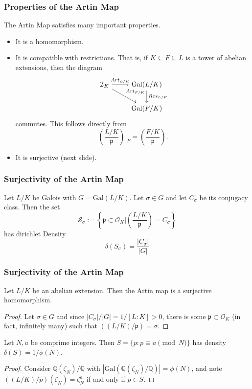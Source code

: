 \documentclass{beamer}
\newcommand{\Gal}{\mathrm{Gal}}
\newcommand{\QQ}{\mathbb{Q}}
\newcommand{\pp}{\mathfrak{p}}
\theoremstyle{plain}
\begin{document}
\begin{frame}[fragile]
    \frametitle{Properties of the Artin Map}
    The Artin Map satisfies many important properties.
    \begin{itemize}
        \item It is a homomorphism.
        \item It is compatible with restrictions. That is, if $K\subseteq F\subseteq L$ is a tower of abelian extensions, then the diagram
        \[
            \begin{tikzcd}
                \mathcal{I}_K \arrow[r,"Art_{L/K}"] \arrow[dr,"Art_{F/K}"] & \Gal(L/K) \arrow[d,"Res_{L/F}"] \\
                 & \Gal(F/K)
            \end{tikzcd}
        \]
        commutes. This follows directly from 
        $$\left(\frac{L/K}{\pp}\right)\bigg|_{F}=\left(\frac{F/K}{\pp}\right).$$
        \item It is surjective (next slide).
    \end{itemize}
\end{frame}

\begin{frame}
    \frametitle{Surjectivity of the Artin Map}
    \begin{theorem} Let $L/K$ be Galois with $G=\Gal(L/K)$. Let $\sigma\in G$ and let $C_\sigma$ be its conjugacy class. Then the set 
    $$\mathcal{S}_\sigma:=\left\{\pp\subset\mathcal{O}_K|\left(\frac{L/K}{\pp}\right)=C_\sigma\right\}$$
    has dirichlet Density
    $$\delta(S_\sigma)=\frac{|C_\sigma|}{|G|}$$
    \end{theorem}
\end{frame}

\begin{frame}
    \frametitle{Surjectivity of the Artin Map}
    \begin{corollary}
        Let $L/K$ be an abelian extension. Then the Artin map is a surjective homomorphism.
    \end{corollary}
    \begin{proof}
        Let $\sigma\in G$ and since $|C_\sigma|/|G|=1/[L:K]>0$, there is some $\pp\subset\mathcal{O}_K$ (in fact, infinitely many) such that $((L/K)/\pp)=\sigma$.
    \end{proof}
    \begin{corollary}
        Let $N,a$ be comprime integers. Then $S=\{p :p\equiv a\pmod{N}\}$ has density $\delta(S)=1/\phi(N)$.
    \end{corollary}
    \begin{proof}
        Consider $\QQ(\zeta_N)/\QQ$ with $|\Gal(\QQ(\zeta_N)/\QQ)|=\phi(N)$, and note $((L/K)/p)(\zeta_N)=\zeta_N^a$ if and only if $p\in S$. 
    \end{proof}
\end{frame}
\end{document}
